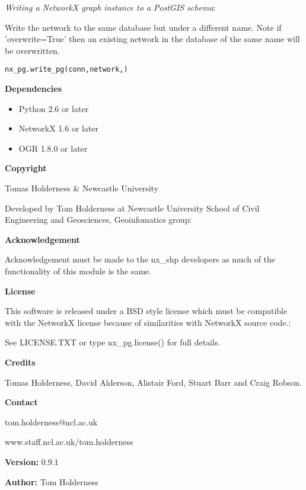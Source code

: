 \textit{Writing a NetworkX graph instance to a PostGIS schema}:

Write the network to the same database but under a different name. Note if 
'overwrite=True' then an existing network in the database of the same name 
will be overwritten.

\begin{alltt}
\pysrcprompt{{\textgreater}{\textgreater}{\textgreater} }nx\_pg.write\_pg(conn, network, )\end{alltt}
\textbf{Dependencies}

\begin{itemize}
\setlength{\parskip}{0.6ex}
  \item Python 2.6 or later

  \item NetworkX 1.6 or later

  \item OGR 1.8.0 or later

\end{itemize}

\textbf{Copyright}

Tomas Holderness \& Newcastle University

Developed by Tom Holderness at Newcastle University School of Civil 
Engineering and Geosciences, Geoinfomatics group:

\textbf{Acknowledgement}

Acknowledgement must be made to the nx\_shp developers as much of the 
functionality of this module is the same.

\textbf{License}

This software is released under a BSD style license which must be 
compatible with the NetworkX license because of similarities with NetworkX 
source code.:

See LICENSE.TXT or type nx\_pg.license() for full details.

\textbf{Credits}

Tomas Holderness, David Alderson, Alistair Ford, Stuart Barr and Craig 
Robson.

\textbf{Contact}

tom.holderness@ncl.ac.uk

www.staff.ncl.ac.uk/tom.holderness

\textbf{Version:} 0.9.1



\textbf{Author:} Tom Holderness




